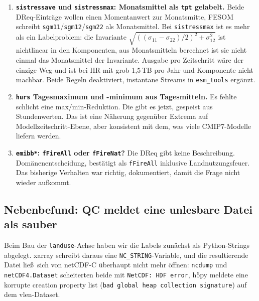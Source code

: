 \documentclass[11pt,a4paper]{article}
\newcommand{\code}[1]{\texttt{\small #1}}
\begin{document}
\begin{enumerate}
Abweichung im Mittel $+0{,}094\,\%$, maximal $0{,}107\,\%$, Korrelation
$1{,}000000$. Der Rest ist die sub-t\"agliche Kovarianz zwischen Dicke und
Konzentration, die das Produkt zweier Tagesmittel verliert. Gemessen:
365 Zeitschritte, keine NaN. Ein t\"aglicher \code{m\_ice}-Stream ist in
\code{esm\_tools} erg\"anzt und macht die N\"aherung f\"ur sp\"atere L\"aufe
\"uberfl\"ussig.

\item \textbf{\code{sistressave} und \code{sistressmax}: Monatsmittel als \code{tpt}
gelabelt.} Beide DReq-Eintr\"age wollen einen Momentanwert zur Monatsmitte, FESOM
schreibt \code{sgm11}/\code{sgm12}/\code{sgm22} als Monatsmittel. Bei
\code{sistressmax} ist es mehr als ein Labelproblem: die Invariante
$\sqrt{((\sigma_{11}-\sigma_{22})/2)^2 + \sigma_{12}^2}$ ist nichtlinear in den
Komponenten, aus Monatsmitteln berechnet ist sie nicht einmal das Monatsmittel der
Invariante. Ausgabe pro Zeitschritt w\"are der einzige Weg und ist bei HR mit
grob 1{,}5\,TB pro Jahr und Komponente nicht machbar. Beide Regeln deaktiviert,
instantane Streams in \code{esm\_tools} erg\"anzt.

\item \textbf{\code{hurs} Tagesmaximum und -minimum aus Tagesmitteln.} Es fehlte
schlicht eine max/min-Reduktion. Die gibt es jetzt, gespeist aus Stundenwerten.
Das ist eine N\"aherung gegen\"uber Extrema auf Modellzeitschritt-Ebene, aber
konsistent mit dem, was viele CMIP7-Modelle liefern werden.

\item \textbf{\code{emibb*}: \code{fFireAll} oder \code{fFireNat}?} Die DReq gibt
keine Beschreibung. Dom\"anenentscheidung, best\"atigt als \code{fFireAll}
inklusive Landnutzungsfeuer. Das bisherige Verhalten war richtig, dokumentiert,
damit die Frage nicht wieder aufkommt.
\end{enumerate}

\subsection*{Nebenbefund: QC meldet eine unlesbare Datei als sauber}

Beim Bau der \code{landuse}-Achse haben wir die Labels zun\"achst als
Python-Strings abgelegt. xarray schreibt daraus eine \code{NC\_STRING}-Variable, und
die resultierende Datei lie\ss\ sich von netCDF-C \"uberhaupt nicht mehr \"offnen:
\code{ncdump} und \code{netCDF4.Dataset} scheiterten beide mit
\code{NetCDF: HDF error}, h5py meldete eine korrupte creation property list
(\code{bad global heap collection signature}) auf dem vlen-Dataset.
\end{document}
